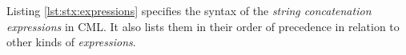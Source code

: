 Listing \ref{lst:stx:expressions} specifies the syntax of
the \emph{string concatenation expressions} in CML.
It also lists them in their order of precedence
in relation to other kinds of \emph{expressions}.
